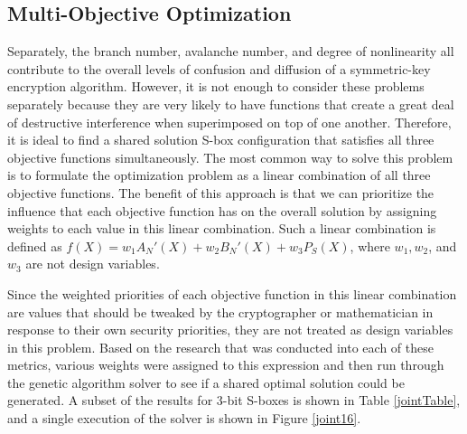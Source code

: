 \documentclass[11pt]{article}
\begin{document}
\subsection{Multi-Objective Optimization}
Separately, the branch number, avalanche number, and degree of nonlinearity all contribute to the overall levels of confusion and diffusion of a symmetric-key encryption algorithm. However, it is not enough to consider these problems separately because they are very likely to have functions that create a great deal of destructive interference when superimposed on top of one another. Therefore, it is ideal to find a shared solution S-box configuration that satisfies all three objective functions simultaneously. The most common way to solve this problem is to formulate the optimization problem as a linear combination of all three objective functions. The benefit of this approach is that we can prioritize the influence that each objective function has on the overall solution by assigning weights to each value in this linear combination. Such a linear combination is defined as $f(X) = w_1A_N'(X) + w_2B_N'(X) + w_3P_S(X)$, where $w_1, w_2$, and $w_3$ are not design variables. 

Since the weighted priorities of each objective function in this linear combination are values that should be tweaked by the cryptographer or mathematician in response to their own security priorities, they are not treated as design variables in this problem. Based on the research that was conducted into each of these metrics, various weights were assigned to this expression and then run through the genetic algorithm solver to see if a shared optimal solution could be generated. A subset of the results for $3$-bit S-boxes is shown in Table \ref{jointTable}, and a single execution of the solver is shown in Figure \ref{joint16}.
\end{document}
